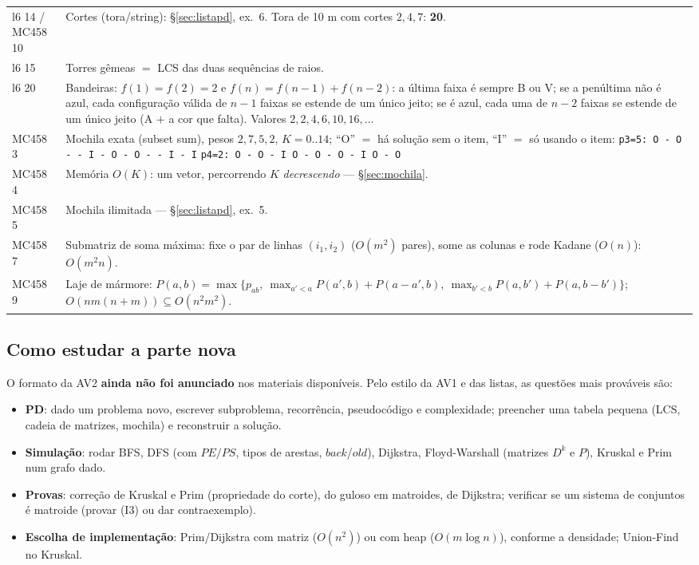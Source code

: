 \begin{center}
\begin{tabularx}{\linewidth}{@{}lX@{}}
l6 14 / MC458 10 & Cortes (tora/string): §\ref{sec:listapd}, ex.~6. Tora de 10 m com cortes $2,4,7$: \textbf{20}.\\
l6 15 & Torres gêmeas $=$ LCS das duas sequências de raios.\\
l6 20 & Bandeiras: $f(1)=f(2)=2$ e $f(n)=f(n-1)+f(n-2)$: a última faixa é sempre B ou V; se a penúltima não é azul, cada configuração válida de $n-1$ faixas se estende de um único jeito; se é azul, cada uma de $n-2$ faixas se estende de um único jeito (A $+$ a cor que falta). Valores $2,2,4,6,10,16,\dots$\\
\midrule
MC458 3 & Mochila exata (subset sum), pesos $2,7,5,2$, $K=0..14$; ``O'' $=$ há solução sem o item, ``I'' $=$ só usando o item: \newline
\texttt{p3=5: O - O - - I - O - O - - I - I}\newline
\texttt{p4=2: O - O - I O - O - O - I O - O}\\
MC458 4 & Memória $O(K)$: um vetor, percorrendo $K$ \emph{decrescendo} --- §\ref{sec:mochila}.\\
MC458 5 & Mochila ilimitada --- §\ref{sec:listapd}, ex.~5.\\
MC458 7 & Submatriz de soma máxima: fixe o par de linhas $(i_1,i_2)$ ($O(m^2)$ pares), some as colunas e rode Kadane ($O(n)$): $O(m^2n)$.\\
MC458 9 & Laje de mármore: $P(a,b)=\max\{p_{ab},\ \max_{a'<a}P(a',b)+P(a-a',b),\ \max_{b'<b}P(a,b')+P(a,b-b')\}$; $O(nm(n+m))\subseteq O(n^2m^2)$.\\
\bottomrule
\end{tabularx}
\end{center}

\subsection{Como estudar a parte nova}
O formato da AV2 \textbf{ainda não foi anunciado} nos materiais disponíveis. Pelo estilo da AV1 e das listas, as questões mais prováveis são:
\begin{prova}
\begin{itemize}
  \item \textbf{PD}: dado um problema novo, escrever subproblema, recorrência, pseudocódigo e complexidade; preencher uma tabela pequena (LCS, cadeia de matrizes, mochila) e reconstruir a solução.
  \item \textbf{Simulação}: rodar BFS, DFS (com $PE/PS$, tipos de arestas, $back$/$old$), Dijkstra, Floyd-Warshall (matrizes $D^k$ e $P$), Kruskal e Prim num grafo dado.
  \item \textbf{Provas}: correção de Kruskal e Prim (propriedade do corte), do guloso em matroides, de Dijkstra; verificar se um sistema de conjuntos é matroide (provar (I3) ou dar contraexemplo).
  \item \textbf{Escolha de implementação}: Prim/Dijkstra com matriz ($O(n^2)$) ou com heap ($O(m\log n)$), conforme a densidade; Union-Find no Kruskal.
\end{itemize}
\end{prova}

